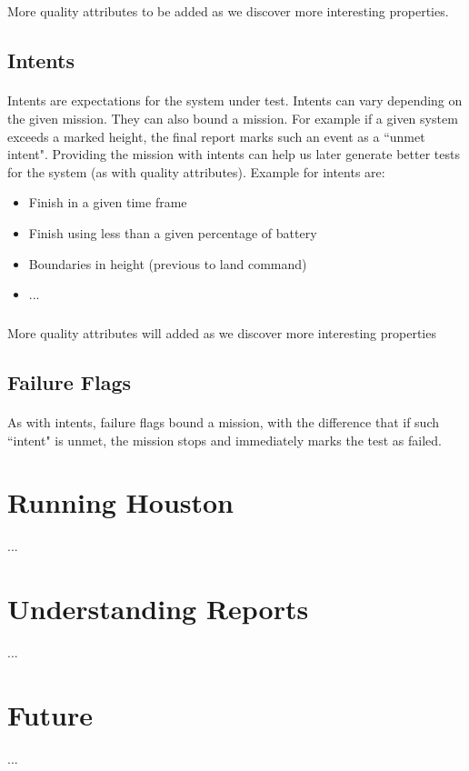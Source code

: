 \documentclass[11pt, a4paper]{article}
\begin{document}
\subparagraph{}
More quality attributes to be added as we discover more interesting properties.

\subsection{Intents}
\paragraph{}
Intents are expectations for the system under test. Intents can vary depending on the given mission. They can also bound a mission. For example if a given system exceeds a marked height, the final report marks such an event as a ``unmet intent". Providing the mission with intents can help us later generate better tests for the system (as with quality attributes). Example for intents are:
\begin{itemize}
	\itemsep-.5em
	\item Finish in a given time frame
	\item Finish using less than a given percentage of battery  
	\item Boundaries in height (previous to land command)
	\item ...		
\end{itemize}
\subparagraph{}
More quality attributes will added as we discover more interesting properties

\subsection{Failure Flags}
\paragraph{}
As with intents, failure flags bound a mission, with the difference that if such ``intent" is unmet, the mission stops and immediately marks the test as failed.  
\section{Running Houston}
...
\section{Understanding Reports}
...
\section{Future}
...



	
\end{document}
